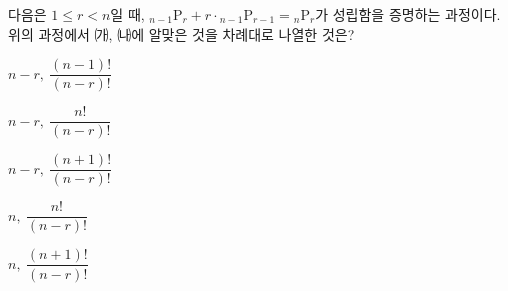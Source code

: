 다음은 $1\le r<n$일 때, ${}_{n-1}\mathrm{P}_r+r\cdot{}_{n-1}\mathrm{P}_{r-1}={}_n\mathrm{P}_r$가 성립함을 증명하는 과정이다.\noindent 위의 과정에서 ㈎, ㈏에 알맞은 것을 차례대로 나열한 것은?
\begin{choicesii}{\rule[-3ex]{0pt}{8ex}$n-r,\ \dfrac{(n-1)!}{(n-r)!}$}{\rule[-3ex]{0pt}{8ex}$n-r,\ \dfrac{n!}{(n-r)!}$}{\rule[-3ex]{0pt}{8ex}$n-r,\ \dfrac{(n+1)!}{(n-r)!}$}{\rule[-3ex]{0pt}{8ex}$n,\ \dfrac{n!}{(n-r)!}$}{\rule[-3ex]{0pt}{8ex}$n,\ \dfrac{(n+1)!}{(n-r)!}$}\end{choicesii}
